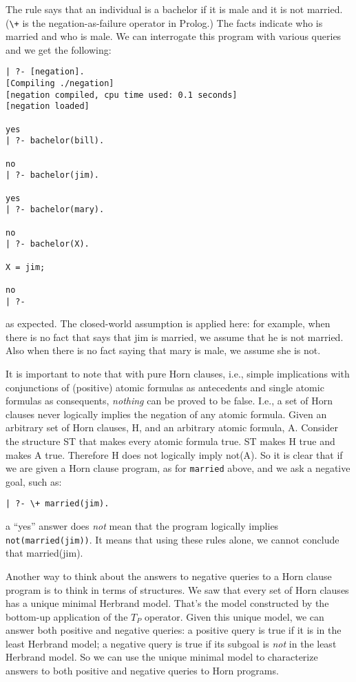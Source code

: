 The rule says that an individual is a bachelor if it is male and it is
not married. (\verb|\+| is the negation-as-failure operator in
Prolog.)  The facts indicate who is married and who is male.  We can
interrogate this program with various queries and we get the following:
\begin{verbatim}
| ?- [negation].
[Compiling ./negation]
[negation compiled, cpu time used: 0.1 seconds]
[negation loaded]

yes
| ?- bachelor(bill).

no
| ?- bachelor(jim).

yes
| ?- bachelor(mary).

no
| ?- bachelor(X).

X = jim;

no
| ?- 
\end{verbatim}
as expected.  The closed-world assumption is applied here: for
example, when there is no fact that says that jim is married, we
assume that he is not married.  Also when there is no fact saying that
mary is male, we assume she is not.

It is important to note that with pure Horn clauses, i.e., simple
implications with conjunctions of (positive) atomic formulas as
antecedents and single atomic formulas as consequents, {\em nothing}
can be proved to be false.  I.e., a set of Horn clauses never
logically implies the negation of any atomic formula.  Given an
arbitrary set of Horn clauses, H, and an arbitrary atomic formula,
A. Consider the structure ST that makes every atomic formula true.  ST
makes H true and makes A true.  Therefore H does not logically imply
not(A).  So it is clear that if we are given a Horn clause program, as
for \verb|married| above, and we ask a negative goal, such as:
\begin{verbatim}
| ?- \+ married(jim).
\end{verbatim}
a ``yes'' answer does {\em not} mean that the program logically
implies \verb|not(married(jim))|.  It means that using these rules
alone, we cannot conclude that married(jim).  

Another way to think about the answers to negative queries to a Horn
clause program is to think in terms of structures.  We saw that every
set of Horn clauses has a unique minimal Herbrand model.  That's the
model constructed by the bottom-up application of the $T_P$ operator.
Given this unique model, we can answer both positive and negative
queries: a positive query is true if it is in the least Herbrand
model; a negative query is true if its subgoal is {\em not} in the
least Herbrand model.  So we can use the unique minimal model to
characterize answers to both positive and negative queries to Horn
programs.

